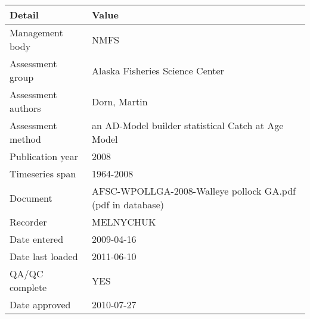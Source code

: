 \begin{table}[htb]
\centering
\begin{tabular}{lp{7cm}}
\toprule
Detail & Value \\
\midrule
Management body    & NMFS                                                       \\
Assessment group   & Alaska Fisheries Science Center                            \\
Assessment authors & Dorn, Martin                                               \\
Assessment method  & an AD-Model builder statistical Catch at Age Model         \\
Publication year   & 2008                                                       \\
Timeseries span    & 1964-2008                                                  \\
Document           & AFSC-WPOLLGA-2008-Walleye pollock GA.pdf (pdf in database) \\
Recorder           & MELNYCHUK                                                  \\
Date entered       & 2009-04-16                                                 \\
Date last loaded   & 2011-06-10                                                 \\
QA/QC complete     & YES                                                        \\
Date approved      & 2010-07-27                                                 \\
\bottomrule
\end{tabular}
\label{tab:assessdet}
\end{table}
